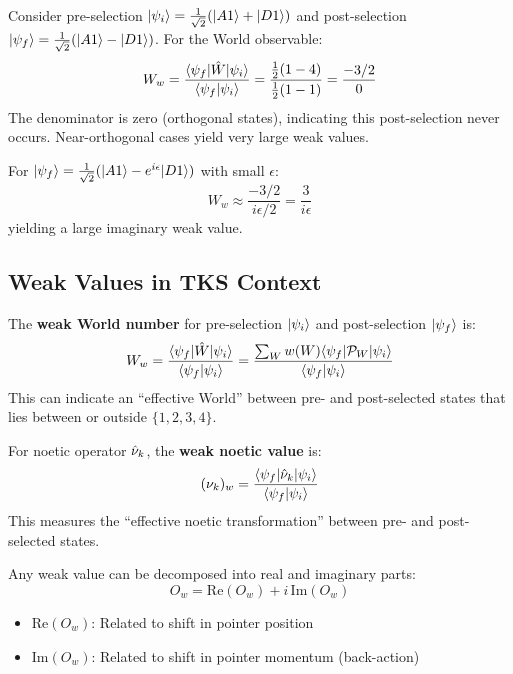 \begin{example}
\label{ex:anomalous-weak}
Consider pre-selection $|\psi_i\rangle = \frac{1}{\sqrt{2}}(|A1\rangle + |D1\rangle)$ and post-selection $|\psi_f\rangle = \frac{1}{\sqrt{2}}(|A1\rangle - |D1\rangle)$. For the World observable:
\[
W_w = \frac{\langle \psi_f|\hat{W}|\psi_i\rangle}{\langle\psi_f|\psi_i\rangle} = \frac{\frac{1}{2}(1 - 4)}{\frac{1}{2}(1 - 1)} = \frac{-3/2}{0}
\]
The denominator is zero (orthogonal states), indicating this post-selection never occurs. Near-orthogonal cases yield very large weak values.

For $|\psi_f\rangle = \frac{1}{\sqrt{2}}(|A1\rangle - e^{i\epsilon}|D1\rangle)$ with small $\epsilon$:
\[
W_w \approx \frac{-3/2}{i\epsilon/2} = \frac{3}{i\epsilon}
\]
yielding a large imaginary weak value.
\end{example}

\subsection{Weak Values in TKS Context}

\begin{definition}
\label{def:weak-world}
The \textbf{weak World number} for pre-selection $|\psi_i\rangle$ and post-selection $|\psi_f\rangle$ is:
\[
W_w = \frac{\langle \psi_f|\hat{W}|\psi_i\rangle}{\langle\psi_f|\psi_i\rangle} = \frac{\sum_W w(W) \langle\psi_f|\mathcal{P}_W|\psi_i\rangle}{\langle\psi_f|\psi_i\rangle}
\]
This can indicate an ``effective World'' between pre- and post-selected states that lies between or outside $\{1, 2, 3, 4\}$.
\end{definition}

\begin{definition}
\label{def:weak-noetic}
For noetic operator $\hat{\nu}_k$, the \textbf{weak noetic value} is:
\[
(\nu_k)_w = \frac{\langle \psi_f|\hat{\nu}_k|\psi_i\rangle}{\langle\psi_f|\psi_i\rangle}
\]
This measures the ``effective noetic transformation'' between pre- and post-selected states.
\end{definition}

\begin{proposition}
\label{prop:weak-decomposition}
Any weak value can be decomposed into real and imaginary parts:
\[
O_w = \mathrm{Re}(O_w) + i \, \mathrm{Im}(O_w)
\]
\begin{itemize}
  \item $\mathrm{Re}(O_w)$: Related to shift in pointer position
  \item $\mathrm{Im}(O_w)$: Related to shift in pointer momentum (back-action)
\end{itemize}
\end{proposition}


